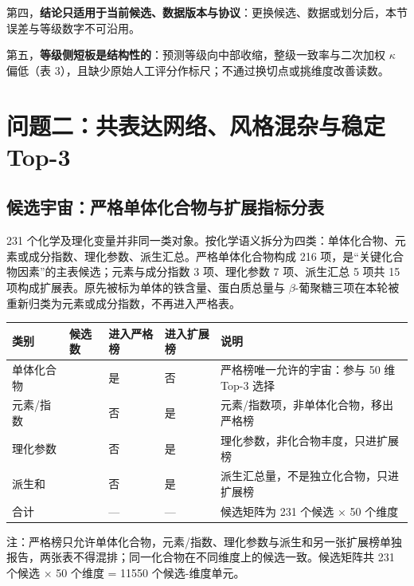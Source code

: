 \documentclass[11pt,a4paper]{article}
\newenvironment{bptable}{%
  \par\medskip\noindent\begin{minipage}{\linewidth}\centering
}{%
  \end{minipage}\par\medskip
}
\newenvironment{tablenote}{%
  \par\smallskip\noindent\footnotesize
  \setlength{\parindent}{0pt}\setlength{\parskip}{0pt}%
  \raggedright
}{%
  \par\medskip
}
\begin{document}
第四，\textbf{结论只适用于当前候选、数据版本与协议}：更换候选、数据或划分后，本节误差与等级数字不可沿用。

第五，\textbf{等级侧短板是结构性的}：预测等级向中部收缩，整级一致率与二次加权
\(\kappa\) 偏低（表
3），且缺少原始人工评分作标尺；不通过换切点或挑维度改善读数。

\section{问题二：共表达网络、风格混杂与稳定
Top-3}\label{ux95eeux9898ux4e8cux5171ux8868ux8fbeux7f51ux7edcux98ceux683cux6df7ux6742ux4e0eux7a33ux5b9a-top-3}

\subsection{候选宇宙：严格单体化合物与扩展指标分表}\label{ux5019ux9009ux5b87ux5b99ux4e25ux683cux5355ux4f53ux5316ux5408ux7269ux4e0eux6269ux5c55ux6307ux6807ux5206ux8868}

231
个化学及理化变量并非同一类对象。按化学语义拆分为四类：单体化合物、元素或成分指数、理化参数、派生汇总。严格单体化合物构成
216 项，是``关键化合物因素''的主表候选；元素与成分指数 3 项、理化参数 7
项、派生汇总 5 项共 15
项构成扩展表。原先被标为单体的铁含量、蛋白质总量与
\(\beta\)-葡聚糖三项在本轮被重新归类为元素或成分指数，不再进入严格表。

\begin{bptable}
\setcounter{table}{5}
\label{tab:q2-universe}
\par\smallskip
\small
\begin{tabular}{@{}>{\raggedright\arraybackslash}p{}>{\raggedleft\arraybackslash}p{}>{\raggedright\arraybackslash}p{}>{\raggedright\arraybackslash}p{}>{\raggedright\arraybackslash}p{}@{}}
\toprule
类别 & 候选数 & 进入严格榜 & 进入扩展榜 & 说明 \\
\midrule
单体化合物 & 216 & 是 & 否 & 严格榜唯一允许的宇宙：参与 50 维 Top-3 选择 \\
元素/\allowbreak{}指数 & 3 & 否 & 是 & 元素/\allowbreak{}指数项，非单体化合物，移出严格榜 \\
理化参数 & 7 & 否 & 是 & 理化参数，非化合物丰度，只进扩展榜 \\
派生和 & 5 & 否 & 是 & 派生汇总量，不是独立化合物，只进扩展榜 \\
合计 & 231 & — & — & 候选矩阵为 231 个候选 × 50 个维度 \\
\bottomrule
\end{tabular}
\begin{tablenote}注：严格榜只允许单体化合物，元素/指数、理化参数与派生和另一张扩展榜单独报告，两张表不得混排；同一化合物在不同维度上的候选一致。候选矩阵共 231 个候选 × 50 个维度 = 11550 个候选-维度单元。\end{tablenote}
\end{bptable}
\end{document}
